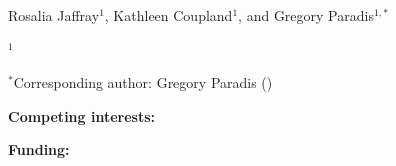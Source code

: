 \documentclass[12pt,letterpaper]{article}
\begin{document}
\doublespacing
\linenumbers
\setlength{\emergencystretch}{2em}

\noindent{\Large\bfseries \papertitle\par}
\vspace{1.5em}

\noindent Rosalia Jaffray$^{1}$, Kathleen Coupland$^{1}$, and Gregory Paradis$^{1,*}$

\vspace{1em}
\noindent $^{1}$\affiliation

\vspace{1em}
\noindent $^{*}$Corresponding author: Gregory Paradis (\corremail)

\vspace{1em}
\noindent\textbf{Competing interests:} \competinginterests

\noindent\textbf{Funding:} \fundingstatement
\clearpage












\end{document}
